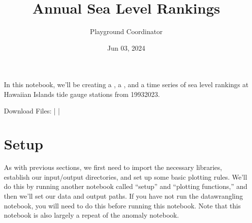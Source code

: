 \documentclass[letterpaper,10pt,english]{jupyterBook}
\title{Annual Sea Level Rankings}
\date{Jun 03, 2024}
\author{Playground Coordinator}
\begin{document}
\pagestyle{empty}
\sphinxmaketitle
\pagestyle{plain}
\sphinxtableofcontents
\pagestyle{normal}
\label{\detokenize{notebooks/regional_and_local/SL_Rankings_annual::doc}}


\begin{figure}[htbp]
\centering

\noindent{}
\end{figure}

\sphinxAtStartPar
In this notebook, we’ll be creating a {\hyperref[\detokenize{notebooks/regional_and_local/SL_Rankings_annual:sl-rankings-results}]{}}, a {\hyperref[\detokenize{notebooks/regional_and_local/SL_Rankings_annual:SL_rankings_map}]{}}, and a time series {\hyperref[\detokenize{notebooks/regional_and_local/SL_Rankings_annual:sl-rankings-timeseries}]{}} of sea level rankings at Hawaiian Islands tide gauge stations from 1993\sphinxhyphen{}2023.

\sphinxAtStartPar
Download Files:
 |
 |


\part{Setup}
\label{\detokenize{notebooks/regional_and_local/SL_Rankings_annual:setup}}
\sphinxAtStartPar
As with previous sections, we first need to import the necessary libraries, establish our input/output directories, and set up some basic plotting rules. We’ll do this by running another notebook called “setup” and “plotting functions,” and then we’ll set our data and output paths. If you have not run the datawrangling notebook, you will need to do this before running this notebook. Note that this notebook is also largely a repeat of the anomaly notebook.
\end{document}
